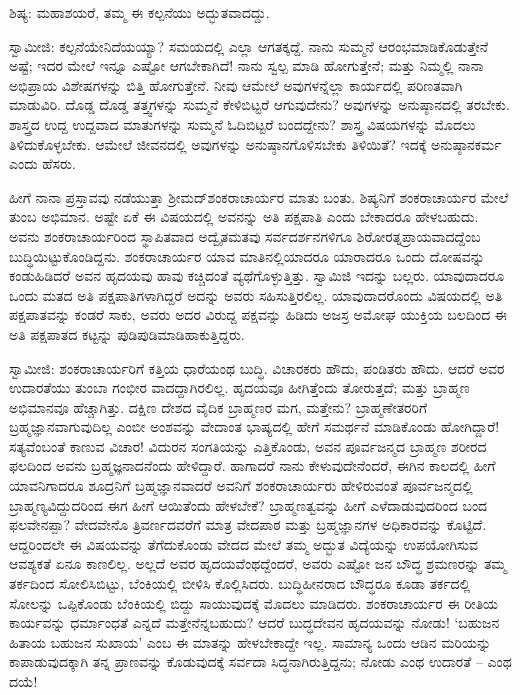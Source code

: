 ಶಿಷ್ಯ: ಮಹಾಶಯರೆ, ತಮ್ಮ ಈ ಕಲ್ಪನೆಯು ಅದ್ಭುತವಾದದ್ದು.

ಸ್ವಾಮೀಜಿ: ಕಲ್ಪನೆಯೇನಿದೆಯಯ್ಯಾ? ಸಮಯದಲ್ಲಿ ಎಲ್ಲಾ ಆಗತಕ್ಕದ್ದೆ. ನಾನು ಸುಮ್ಮನೆ ಆರಂಭಮಾಡಿಕೊಡುತ್ತೇನೆ ಅಷ್ಟೆ; ಇದರ ಮೇಲೆ ಇನ್ನೂ ಎಷ್ಟೋ ಆಗಬೇಕಾಗಿದೆ! ನಾನು ಸ್ವಲ್ಪ ಮಾಡಿ ಹೋಗುತ್ತೇನೆ; ಮತ್ತು ನಿಮ್ಮಲ್ಲಿ ನಾನಾ ಅಭಿಪ್ರಾಯ ವಿಶೇಷಗಳನ್ನು ಬಿತ್ತಿ ಹೋಗುತ್ತೇನೆ. ನೀವು ಆಮೇಲೆ ಅವುಗಳನ್ನೆಲ್ಲಾ ಕಾರ್ಯದಲ್ಲಿ ಪರಿಣತವಾಗಿ ಮಾಡುವಿರಿ. ದೊಡ್ಡ ದೊಡ್ಡ ತತ್ತ್ವಗಳನ್ನು ಸುಮ್ಮನೆ ಕೇಳಿಬಿಟ್ಟರೆ ಆಗುವುದೇನು? ಅವುಗಳನ್ನು ಅನುಷ್ಠಾನದಲ್ಲಿ ತರಬೇಕು. ಶಾಸ್ತ್ರದ ಉದ್ದ ಉದ್ದವಾದ ಮಾತುಗಳನ್ನು ಸುಮ್ಮನೆ ಓದಿಬಿಟ್ಟರೆ ಬಂದದ್ದೇನು? ಶಾಸ್ತ್ರ ವಿಷಯಗಳನ್ನು ಮೊದಲು ತಿಳಿದುಕೊಳ್ಳಬೇಕು. ಆಮೇಲೆ ಜೀವನದಲ್ಲಿ ಅವುಗಳನ್ನು ಅನುಷ್ಠಾನಗೊಳಿಸಬೇಕು ತಿಳಿಯಿತೆ? ಇದಕ್ಕೆ ಅನುಷ್ಠಾನಕರ್ಮ ಎಂದು ಹೆಸರು.

ಹೀಗೆ ನಾನಾ ಪ್ರಸ್ತಾವವು ನಡೆಯುತ್ತಾ ಶ‍್ರೀಮದ್‌ಶಂಕರಾಚಾರ್ಯರ ಮಾತು ಬಂತು. ಶಿಷ್ಯನಿಗೆ ಶಂಕರಾಚಾರ್ಯರ ಮೇಲೆ ತುಂಬ ಅಭಿಮಾನ. ಅಷ್ಟೇ ಏಕೆ ಈ ವಿಷಯದಲ್ಲಿ ಅವನನ್ನು ಅತಿ ಪಕ್ಷಪಾತಿ ಎಂದು ಬೇಕಾದರೂ ಹೇಳಬಹುದು. ಅವನು ಶಂಕರಾಚಾರ್ಯರಿಂದ ಸ್ಥಾಪಿತವಾದ ಅದ್ವೈತಮತವು ಸರ್ವದರ್ಶನಗಳಿಗೂ ಶಿರೋರತ್ನಪ್ರಾಯವಾದದ್ದೆಂಬ ಬುದ್ಧಿಯಿಟ್ಟುಕೊಂಡಿದ್ದನು. ಶಂಕರಾಚಾರ್ಯರ ಯಾವ ಮಾತಿನಲ್ಲಿಯಾದರೂ ಯಾರಾದರೂ ಒಂದು ದೋಷವನ್ನು ಕಂಡುಹಿಡಿದರೆ ಅವನ ಹೃದಯವು ಹಾವು ಕಚ್ಚಿದಂತೆ ವ್ಯಥೆಗೊಳ್ಳುತ್ತಿತ್ತು. ಸ್ವಾಮಿಜಿ ಇದನ್ನು ಬಲ್ಲರು. ಯಾವುದಾದರೂ ಒಂದು ಮತದ ಅತಿ ಪಕ್ಷಪಾತಿಗಳಾಗಿದ್ದರೆ ಅದನ್ನು ಅವರು ಸಹಿಸುತ್ತಿರಲಿಲ್ಲ. ಯಾವುದಾದರೊಂದು ವಿಷಯದಲ್ಲಿ ಅತಿ ಪಕ್ಷಪಾತವನ್ನು ಕಂಡರೆ ಸಾಕು, ಅವರು ಅದರ ವಿರುದ್ದ ಪಕ್ಷವನ್ನು ಹಿಡಿದು ಅಜಸ್ರ ಅಮೋಘ ಯುಕ್ತಿಯ ಬಲದಿಂದ ಈ ಅತಿ ಪಕ್ಷಪಾತದ ಕಟ್ಟನ್ನು ಪುಡಿಪುಡಿಮಾಡಿಹಾಕುತ್ತಿದ್ದರು.

ಸ್ವಾಮೀಜಿ: ಶಂಕರಾಚಾರ್ಯರಿಗೆ ಕತ್ತಿಯ ಧಾರೆಯಂಥ ಬುದ್ಧಿ. ವಿಚಾರಕರು ಹೌದು, ಪಂಡಿತರು ಹೌದು. ಆದರೆ ಅವರ ಉದಾರತೆಯು ತುಂಬಾ ಗಂಭೀರ ವಾದದ್ದಾಗಿರಲಿಲ್ಲ. ಹೃದಯವೂ ಹೀಗಿತ್ತೆಂದು ತೋರುತ್ತದೆ; ಮತ್ತು ಬ್ರಾಹ್ಮಣ ಅಭಿಮಾನವೂ ಹೆಚ್ಚಾಗಿತ್ತು. ದಕ್ಷಿಣ ದೇಶದ ವೈದಿಕ ಬ್ರಾಹ್ಮಣರ ಮಗ, ಮತ್ತೇನು? ಬ್ರಾಹ್ಮಣೇತರರಿಗೆ ಬ್ರಹ್ಮಜ್ಞಾನವಾಗುವುದಿಲ್ಲ ಎಂಬೀ ಅಂಶವನ್ನು ವೇದಾಂತ ಭಾಷ್ಯದಲ್ಲಿ ಹೇಗೆ ಸಮರ್ಥನೆ ಮಾಡಿಕೊಂಡು ಹೋಗಿದ್ದಾರೆ! ಸತ್ಯವೆಂಬಂತೆ ಕಾಣುವ ವಿಚಾರ! ವಿದುರನ ಸಂಗತಿಯನ್ನು ಎತ್ತಿಕೊಂಡು, ಅವನ ಪೂರ್ವಜನ್ಮದ ಬ್ರಾಹ್ಮಣ ಶರೀರದ ಫಲದಿಂದ ಅವನು ಬ್ರಹ್ಮಜ್ಞನಾದನೆಂದು ಹೇಳಿದ್ದಾರೆ. ಹಾಗಾದರೆ ನಾನು ಕೇಳುವುದೇನೆಂದರೆ, ಈಗಿನ ಕಾಲದಲ್ಲಿ ಹೀಗೆ ಯಾವನಿಗಾದರೂ ಶೂದ್ರನಿಗೆ ಬ್ರಹ್ಮಜ್ಞಾನವಾದರೆ ಅವನಿಗೆ ಶಂಕರಾಚಾರ್ಯರು ಹೇಳಿರುವಂತೆ ಪೂರ್ವಜನ್ಮದಲ್ಲಿ ಬ್ರಾಹ್ಮಣ್ಯವಿದ್ದುದರಿಂದ ಈಗ ಹೀಗೆ ಆಯಿತೆಂದು ಹೇಳಬೇಕೆ? ಬ್ರಾಹ್ಮಣತ್ವವನ್ನು ಹೀಗೆ ಎಳೆದಾಡುವುದರಿಂದ ಬಂದ ಫಲವೇನಪ್ಪಾ? ವೇದವೇನೊ ತ್ರಿವರ್ಣದವರೆಗೆ ಮಾತ್ರ ವೇದಪಾಠ ಮತ್ತು ಬ್ರಹ್ಮಜ್ಞಾನಗಳ ಅಧಿಕಾರವನ್ನು ಕೊಟ್ಟಿದೆ. ಆದ್ದರಿಂದಲೇ ಈ ವಿಷಯವನ್ನು ತೆಗೆದುಕೊಂಡು ವೇದದ ಮೇಲೆ ತಮ್ಮ ಅದ್ಭುತ ವಿದ್ಯೆಯನ್ನು ಉಪಯೋಗಿಸುವ ಆವಶ್ಯಕತೆ ಏನೂ ಕಾಣಲಿಲ್ಲ. ಅಲ್ಲದೆ ಅವರ ಹೃದಯವೆಂಥದ್ದೆಂದರೆ, ಅವರು ಎಷ್ಟೋ ಜನ ಬೌದ್ಧ ಶ್ರಮಣರನ್ನು ತಮ್ಮ ತರ್ಕದಿಂದ ಸೋಲಿಸಿಬಿಟ್ಟು, ಬೆಂಕಿಯಲ್ಲಿ ಬೀಳಿಸಿ ಕೊಲ್ಲಿಸಿದರು. ಬುದ್ಧಿಹೀನರಾದ ಬೌದ್ಧರೂ ಕೂಡಾ ತರ್ಕದಲ್ಲಿ ಸೋಲನ್ನು ಒಪ್ಪಿಕೊಂಡು ಬೆಂಕಿಯಲ್ಲಿ ಬಿದ್ದು ಸಾಯುವುದಕ್ಕೆ ಮೊದಲು ಮಾಡಿದರು. ಶಂಕರಾಚಾರ್ಯರ ಈ ರೀತಿಯ ಕಾರ್ಯವನ್ನು ಧರ್ಮಾಂಧತೆ ಎನ್ನದೆ ಮತ್ತೇನೆನ್ನಬಹುದು? ಆದರೆ ಬುದ್ಧದೇವನ ಹೃದಯವನ್ನು ನೋಡು! ‘ಬಹುಜನ ಹಿತಾಯ ಬಹುಜನ ಸುಖಾಯ’ ಎಂಬ ಈ ಮಾತನ್ನು ಹೇಳಬೇಕಾದ್ದೇ ಇಲ್ಲ. ಸಾಮಾನ್ಯ ಒಂದು ಆಡಿನ ಮರಿಯನ್ನು ಕಾಪಾಡುವುದಕ್ಕಾಗಿ ತನ್ನ ಪ್ರಾಣವನ್ನು ಕೊಡುವುದಕ್ಕೆ ಸರ್ವದಾ ಸಿದ್ಧನಾಗಿರುತ್ತಿದ್ದನು; ನೋಡು ಎಂಥ ಉದಾರತೆ – ಎಂಥ ದಯೆ!

